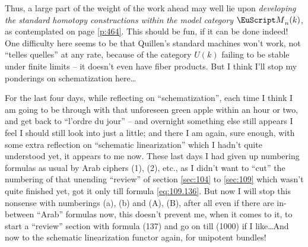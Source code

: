 Thus, a large part of the weight of the work ahead may well lie upon
\emph{developing the standard homotopy constructions within the model
  category $\scrM_n(k)$}, as contemplated on page \ref{p:464}. This
should be fun, if it can be done indeed! One difficulty here seems to
be that Quillen's standard machines won't work, not ``telles quelles''
at any rate, because of the category $U(k)$ failing to be stable under
finite limits -- it doesn't even have fiber products. But I think I'll
stop my ponderings on schematization here\dots

\bigbreak

\presectionfill{}\par

\label{sec:115}%
For the last four days, while reflecting on ``schematization'', each
time I think I am going to be through with that unforeseen green apple
within an hour or two, and get back to ``l'ordre du jour'' -- and
overnight something else still appears I feel I should still look into
just a little; and there I am again, sure enough, with some extra
reflection on ``schematic linearization'' which I hadn't quite
understood yet, it appears to me now. These last days I had given up
numbering formulas as usual by Arab ciphers (1), (2), etc., as I
didn't want to ``cut'' the numbering of that unending ``review'' of
section \ref{sec:104} to \ref{sec:109} which wasn't quite finished
yet, got it only till formula \eqref{eq:109.136}. But now I will stop
this nonsense with numberings (a), (b) and (A), (B), after all even if
there are in-between ``Arab'' formulas now, this doesn't prevent me,
when it comes to it, to start a ``review'' section with formula (137)
and go on till (1000) if I like\dots  And now to the schematic
linearization functor again, for unipotent bundles!

